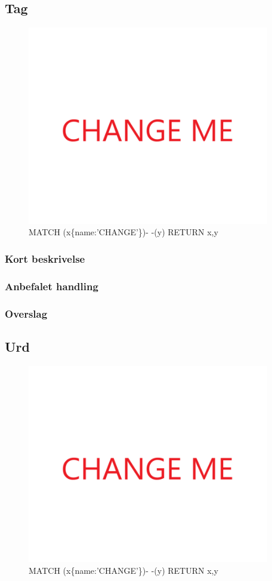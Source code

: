 \documentclass{article}
\begin{document}
\subsection{Tag}
\begin{figure}[h]
\includegraphics[width=300pt]{CHANGE.PNG}
\caption{MATCH (x\{name:'CHANGE'\})- -(y) RETURN x,y}
\end{figure}
\subsubsection{Kort beskrivelse}
\subsubsection{Anbefalet handling}
\subsubsection{Overslag}
\subsection{Urd}
\begin{figure}[h]
\includegraphics[width=300pt]{CHANGE.PNG}
\caption{MATCH (x\{name:'CHANGE'\})- -(y) RETURN x,y}
\end{figure}
\end{document}
